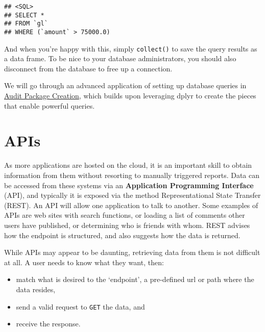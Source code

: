 \documentclass[
]{book}
\newenvironment{Shaded}{\begin{snugshade}}{\end{snugshade}}
\newcommand{\KeywordTok}[1]{\textcolor[rgb]{0.13,0.29,0.53}{\textbf{#1}}}
\newcommand{\NormalTok}[1]{#1}
\newcommand{\OperatorTok}[1]{\textcolor[rgb]{0.81,0.36,0.00}{\textbf{#1}}}
\newcommand{\StringTok}[1]{\textcolor[rgb]{0.31,0.60,0.02}{#1}}
\providecommand{\tightlist}{%
  \setlength{\itemsep}{0pt}\setlength{\parskip}{0pt}}
\begin{document}
\begin{verbatim}
## <SQL>
## SELECT *
## FROM `gl`
## WHERE (`amount` > 75000.0)
\end{verbatim}

And when you're happy with this, simply \texttt{collect()} to save the query results as a data frame. To be nice to your database administrators, you should also disconnect from the database to free up a connection.

\begin{Shaded}
\end{Shaded}

We will go through an advanced application of setting up database queries in \protect\hyperlink{auditpackage}{Audit Package Creation}, which builds upon leveraging dplyr to create the pieces that enable powerful queries.

\hypertarget{apis}{%
\section{APIs}\label{apis}}

As more applications are hosted on the cloud, it is an important skill to obtain information from them without resorting to manually triggered reports. Data can be accessed from these systems via an \textbf{Application Programming Interface} (API), and typically it is exposed via the method Representational State Transfer (REST). An API will allow one application to talk to another. Some examples of APIs are web sites with search functions, or loading a list of comments other users have published, or determining who is friends with whom. REST advises how the endpoint is structured, and also suggests how the data is returned.

While APIs may appear to be daunting, retrieving data from them is not difficult at all. A user needs to know what they want, then:

\begin{itemize}
\tightlist
\item
  match what is desired to the `endpoint', a pre-defined url or path where the data resides,
\item
  send a valid request to \texttt{GET} the data, and
\item
  receive the response.
\end{itemize}
\end{document}
